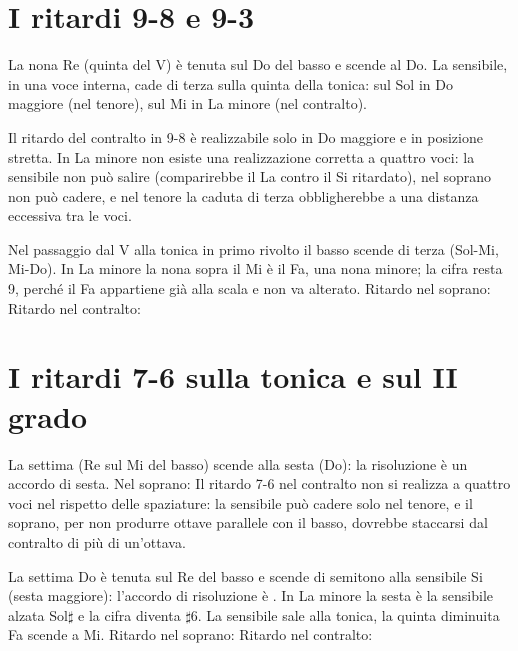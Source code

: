 \section{I ritardi 9-8 e 9-3}
\label{sec:ritardi_nona}

\begin{esempio}
	\label{ex:ritardo_9_8_s}
	La nona Re (quinta del V) è tenuta sul Do del basso e scende al Do. La sensibile, in una voce interna, cade di terza sulla quinta della tonica: sul Sol in Do maggiore (nel tenore), sul Mi in La minore (nel contralto).
\end{esempio}

\begin{esempio}
	\label{ex:ritardo_9_8_a}
	Il ritardo del contralto in 9-8 è realizzabile solo in Do maggiore e in posizione stretta. In La minore non esiste una realizzazione corretta a quattro voci: la sensibile non può salire (comparirebbe il La contro il Si ritardato), nel soprano non può cadere, e nel tenore la caduta di terza obbligherebbe a una distanza eccessiva tra le voci.
\end{esempio}

\begin{esempio}[Ritardo 9-3]
	\label{ex:ritardo_9_3}
	Nel passaggio dal V alla tonica in primo rivolto il basso scende di terza (Sol-Mi, Mi-Do). In La minore la nona sopra il Mi è il Fa, una nona minore; la cifra resta 9, perché il Fa appartiene già alla scala e non va alterato. Ritardo nel soprano:
	Ritardo nel contralto:
\end{esempio}

\section{I ritardi 7-6 sulla tonica e sul II grado}
\label{sec:ritardi_settima}

\begin{esempio}[Ritardo 7-6]
	\label{ex:ritardo_7_6}
	La settima (Re sul Mi del basso) scende alla sesta (Do): la risoluzione è un accordo di sesta. Nel soprano:
	Il ritardo 7-6 nel contralto non si realizza a quattro voci nel rispetto delle spaziature: la sensibile può cadere solo nel tenore, e il soprano, per non produrre ottave parallele con il basso, dovrebbe staccarsi dal contralto di più di un'ottava.
\end{esempio}

\begin{esempio}
	\label{ex:ritardo_7_6d}
	La settima Do è tenuta sul Re del basso e scende di semitono alla sensibile Si (sesta maggiore): l'accordo di risoluzione è . In La minore la sesta è la sensibile alzata Sol$\sharp$ e la cifra diventa $\sharp$6. La sensibile sale alla tonica, la quinta diminuita Fa scende a Mi. Ritardo nel soprano:
	Ritardo nel contralto:
\end{esempio}
